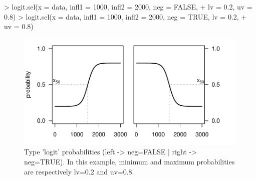 \documentclass[letterpaper, 12pt]{article}
\begin{document}
\vspace*{\fill;}
\newpage


\begin{Schunk}
\begin{Sinput}
> logit.sel(x = data, infl1 = 1000, infl2 = 2000, neg = FALSE, 
+     lv = 0.2, uv = 0.8)
> logit.sel(x = data, infl1 = 1000, infl2 = 2000, neg = TRUE, lv = 0.2, 
+     uv = 0.8)
\end{Sinput}
\end{Schunk}

\begin{figure}[h]
\vspace{-20pt}
\begin{center}
\includegraphics{relation_sel-027}
\end{center}
\vspace{-30pt}
\caption{Type 'logit' probabilities (left -> neg=FALSE |  right -> neg=TRUE). In this example, minimum and maximum probabilities are respectively lv=0.2 and uv=0.8.}
\vspace{-10pt}
\label{fig13}
\end{figure}
\end{document}
